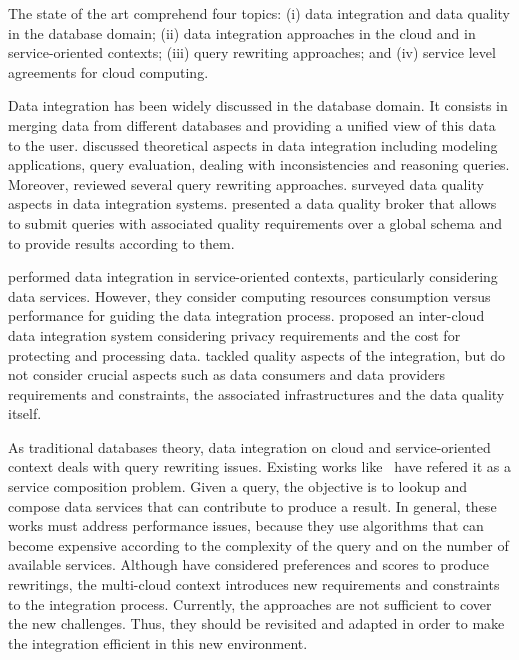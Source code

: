 The state of the art comprehend four topics: 
(i) data integration and data quality in the database domain; 
(ii) data integration approaches in the cloud and in service-oriented contexts; 
(iii) query rewriting approaches; and 
(iv) service level agreements for cloud computing.

Data integration has been widely discussed in the database domain.
It consists in merging data from different databases and providing a unified view of this data to the user.
\cite{Lenzerini:2002} discussed theoretical aspects in data integration including modeling applications, query evaluation, dealing with inconsistencies and reasoning queries.
Moreover, \cite{Halevy:2001} reviewed several query rewriting approaches. 
\cite{Batini2006} surveyed data quality aspects in data integration systems. 
\cite{Scannapieco:2004} presented a data quality broker that allows to submit queries with associated quality requirements over a global schema and to provide results according to them.

\cite{Correndo2010,ElSheikh2013} performed data integration in service-oriented contexts, particularly considering data services. However, they  consider computing resources consumption versus performance for guiding the data integration process. 
\cite{Tian2010} proposed an inter-cloud data integration system considering privacy requirements and the cost for protecting and processing data. 
\cite{Scannapieco:2004,Tian2010,YauY08} tackled quality aspects of the integration, but do not consider crucial aspects such as data consumers and data providers requirements and constraints, the associated infrastructures and the data quality itself. %

As traditional databases theory, data integration on cloud and service-oriented context deals with query rewriting issues. Existing works like~\cite{ba2014,Barhamgi2010,Benouaret2011,Umberto} have refered it as a service composition problem. Given a query, the objective is to lookup and compose data services that can contribute to produce a result. In general, these works must address performance issues, because they use algorithms that can become expensive according to the complexity of the query and on the number of available services. Although \cite{ba2014,Benouaret2011} have considered preferences and scores to produce rewritings, the multi-cloud context introduces new requirements and constraints to the integration process. Currently, the approaches are not sufficient to cover the new challenges. Thus, they should be revisited and adapted in order to make the integration efficient in this new environment. 


